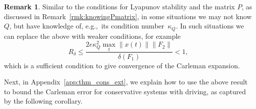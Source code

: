 \documentclass[superscriptaddress,onecolumn,nofootinbib,longbibliography,a4paper,accepted=2026-09-29]{quantumarticle}
\theoremstyle{plain}
\theoremstyle{definition}
\newtheorem{rmk}[thm]{Remark}
\numberwithin{thm}{section}
\numberwithin{assumption}{section}
\numberwithin{lemma}{section}
\numberwithin{prop}{section}
\numberwithin{cor}{section}
\numberwithin{definition}{section}
\numberwithin{rmk}{section}
\numberwithin{equation}{section}
\begin{document}
\begin{rmk}
    Similar to the conditions for Lyapunov stability and the matrix $P$, as discussed in Remark~\ref{rmk:knowingPmatrix}, in some situations we may not know $Q$, but have knowledge of, e.g.,~its condition number~$\kappa_Q$. In such situations we can replace the above with weaker conditions, for example
    \begin{equation}
        R_\delta \le \frac{2e \kappa_Q^2 \max_t \|x(t)\|\|F_2\|}{\delta(F_1)} <1,
    \end{equation}
    which is a sufficient condition to give convergence of the Carleman expansion.
\end{rmk}

Next, in Appendix~\ref{app:thm_cons_ext}, we explain how to use the above result to bound the Carleman error for conservative systems with driving, as captured by the following corollary.
\end{document}
